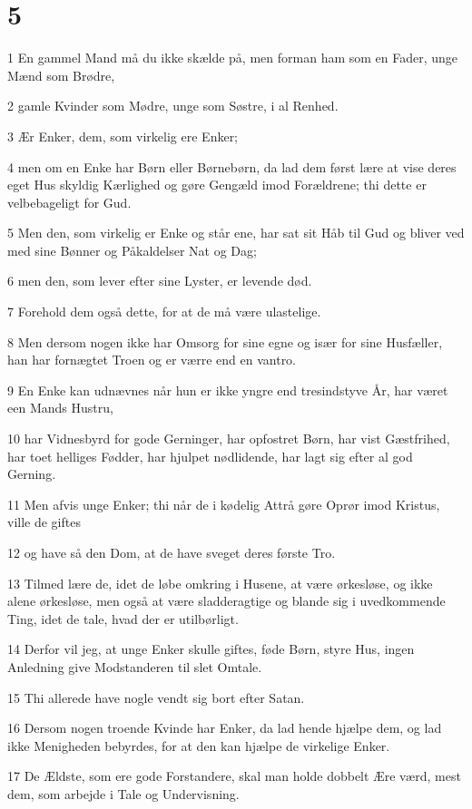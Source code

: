 \chapter{5}

\par 1 En gammel Mand må du ikke skælde på, men forman ham som en Fader, unge Mænd som Brødre,
\par 2 gamle Kvinder som Mødre, unge som Søstre, i al Renhed.
\par 3 Ær Enker, dem, som virkelig ere Enker;
\par 4 men om en Enke har Børn eller Børnebørn, da lad dem først lære at vise deres eget Hus skyldig Kærlighed og gøre Gengæld imod Forældrene; thi dette er velbebageligt for Gud.
\par 5 Men den, som virkelig er Enke og står ene, har sat sit Håb til Gud og bliver ved med sine Bønner og Påkaldelser Nat og Dag;
\par 6 men den, som lever efter sine Lyster, er levende død.
\par 7 Forehold dem også dette, for at de må være ulastelige.
\par 8 Men dersom nogen ikke har Omsorg for sine egne og især for sine Husfæller, han har fornægtet Troen og er værre end en vantro.
\par 9 En Enke kan udnævnes når hun er ikke yngre end tresindstyve År, har været een Mands Hustru,
\par 10 har Vidnesbyrd for gode Gerninger, har opfostret Børn, har vist Gæstfrihed, har toet helliges Fødder, har hjulpet nødlidende, har lagt sig efter al god Gerning.
\par 11 Men afvis unge Enker; thi når de i kødelig Attrå gøre Oprør imod Kristus, ville de giftes
\par 12 og have så den Dom, at de have sveget deres første Tro.
\par 13 Tilmed lære de, idet de løbe omkring i Husene, at være ørkesløse, og ikke alene ørkesløse, men også at være sladderagtige og blande sig i uvedkommende Ting, idet de tale, hvad der er utilbørligt.
\par 14 Derfor vil jeg, at unge Enker skulle giftes, føde Børn, styre Hus, ingen Anledning give Modstanderen til slet Omtale.
\par 15 Thi allerede have nogle vendt sig bort efter Satan.
\par 16 Dersom nogen troende Kvinde har Enker, da lad hende hjælpe dem, og lad ikke Menigheden bebyrdes, for at den kan hjælpe de virkelige Enker.
\par 17 De Ældste, som ere gode Forstandere, skal man holde dobbelt Ære værd, mest dem, som arbejde i Tale og Undervisning.
